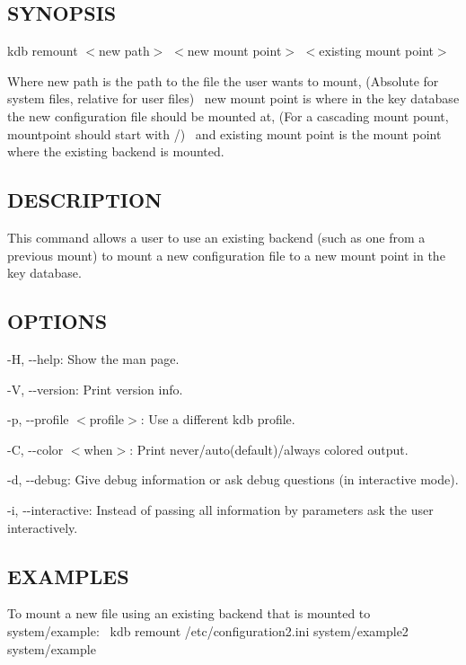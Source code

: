 \subsection*{S\+Y\+N\+O\+P\+S\+IS}

{\ttfamily kdb remount $<$new path$>$ $<$new mount point$>$ $<$existing mount point$>$}

Where {\ttfamily new path} is the path to the file the user wants to mount, (Absolute for system files, relative for user files)~\newline
 {\ttfamily new mount point} is where in the key database the new configuration file should be mounted at, (For a cascading mount pount, {\ttfamily mountpoint} should start with {\ttfamily /})~\newline
 and {\ttfamily existing mount point} is the mount point where the existing backend is mounted.~\newline


\subsection*{D\+E\+S\+C\+R\+I\+P\+T\+I\+ON}

This command allows a user to use an existing backend (such as one from a previous mount) to mount a new configuration file to a new mount point in the key database.~\newline


\subsection*{O\+P\+T\+I\+O\+NS}


\begin{DoxyItemize}
\item {\ttfamily -\/H}, {\ttfamily -\/-\/help}\+: Show the man page.
\item {\ttfamily -\/V}, {\ttfamily -\/-\/version}\+: Print version info.
\item {\ttfamily -\/p}, {\ttfamily -\/-\/profile $<$profile$>$}\+: Use a different kdb profile.
\item {\ttfamily -\/C}, {\ttfamily -\/-\/color $<$when$>$}\+: Print never/auto(default)/always colored output.
\item {\ttfamily -\/d}, {\ttfamily -\/-\/debug}\+: Give debug information or ask debug questions (in interactive mode).
\item {\ttfamily -\/i}, {\ttfamily -\/-\/interactive}\+: Instead of passing all information by parameters ask the user interactively.
\end{DoxyItemize}

\subsection*{E\+X\+A\+M\+P\+L\+ES}

To mount a new file using an existing backend that is mounted to {\ttfamily system/example}\+:~\newline
 {\ttfamily kdb remount /etc/configuration2.ini system/example2 system/example}~\newline
 
